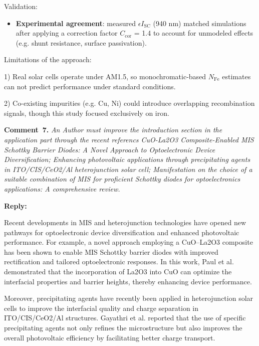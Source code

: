 \documentclass[a4paper,fleqn]{cas-sc}
\begin{document}
Validation:

\begin{itemize}
    \item \textbf{Experimental agreement}: measured $\epsilon I_\mathrm{SC}$ (940 nm) matched simulations after applying a correction factor $C_\mathrm{cor}$ = 1.4 to account for unmodeled effects (e.g. shunt resistance, surface passivation).
\end{itemize}

Limitations of the approach:

1) Real solar cells operate under AM1.5, so monochromatic-based $N_\mathrm{Fe}$ estimates can not predict performance under standard conditions.


2) Co-existing impurities (e.g. Cu, Ni) could introduce overlapping recombination signals, though this study focused exclusively on iron.


\vspace{1cm}
\noindent
\textcolor[rgb]{0.00,0.50,1.00}{\textbf{Comment~7.}}
\emph{An Author must improve the introduction section in the application part through the recent referencs
CuO-La2O3 Composite-Enabled MIS Schottky Barrier Diodes: A Novel Approach to Optoelectronic Device Diversification; Enhancing photovoltaic applications through precipitating agents in ITO/CIS/CeO2/Al heterojunction solar cell; Manifestation on the choice of a suitable combination of MIS for proficient Schottky diodes for optoelectronics applications: A comprehensive review.}

\noindent
\textcolor[rgb]{0.51,0.00,0.00}{\textbf{Reply:}}



Recent developments in MIS and heterojunction technologies have opened new pathways for optoelectronic device diversification and enhanced photovoltaic performance. For example, a novel approach employing a CuO–La2O3 composite has been shown to enable MIS Schottky barrier diodes with improved rectification and tailored optoelectronic responses. In this work, Paul et al. demonstrated that the incorporation of La2O3 into CuO can optimize the interfacial properties and barrier heights, thereby enhancing device performance.

Moreover, precipitating agents have recently been applied in heterojunction solar cells to improve the interfacial quality and charge separation in ITO/CIS/CeO2/Al structures. Gayathri et al. reported that the use of specific precipitating agents not only refines the microstructure but also improves the overall photovoltaic efficiency by facilitating better charge transport.
\end{document}
